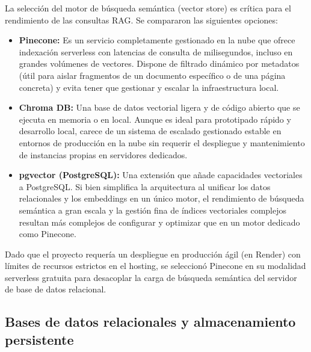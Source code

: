 \documentclass[12pt,a4paper,oneside]{report}
\begin{document}
La selección del motor de búsqueda semántica (vector store) es crítica para el rendimiento de las consultas RAG. Se compararon las siguientes opciones:
\begin{itemize}
    \item \textbf{Pinecone:} Es un servicio completamente gestionado en la nube que ofrece indexación serverless con latencias de consulta de milisegundos, incluso en grandes volúmenes de vectores. Dispone de filtrado dinámico por metadatos (útil para aislar fragmentos de un documento específico o de una página concreta) y evita tener que gestionar y escalar la infraestructura local.
    \item \textbf{Chroma DB:} Una base de datos vectorial ligera y de código abierto que se ejecuta en memoria o en local. Aunque es ideal para prototipado rápido y desarrollo local, carece de un sistema de escalado gestionado estable en entornos de producción en la nube sin requerir el despliegue y mantenimiento de instancias propias en servidores dedicados.
    \item \textbf{pgvector (PostgreSQL):} Una extensión que añade capacidades vectoriales a PostgreSQL. Si bien simplifica la arquitectura al unificar los datos relacionales y los embeddings en un único motor, el rendimiento de búsqueda semántica a gran escala y la gestión fina de índices vectoriales complejos resultan más complejos de configurar y optimizar que en un motor dedicado como Pinecone.
\end{itemize}

Dado que el proyecto requería un despliegue en producción ágil (en Render) con límites de recursos estrictos en el hosting, se seleccionó Pinecone en su modalidad serverless gratuita para desacoplar la carga de búsqueda semántica del servidor de base de datos relacional.

\subsection*{Bases de datos relacionales y almacenamiento persistente}
\end{document}
